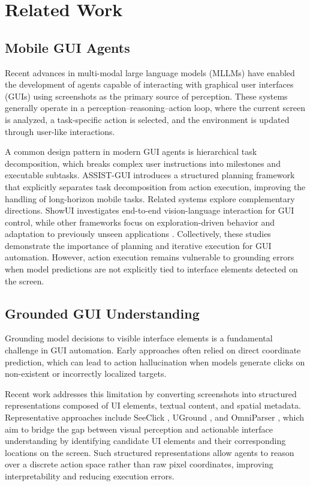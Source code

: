 \section{Related Work}
\label{related}

\subsection{Mobile GUI Agents}

Recent advances in multi-modal large language models (MLLMs) have enabled the development of agents capable of interacting with graphical user interfaces (GUIs) using screenshots as the primary source of perception. These systems generally operate in a perception--reasoning--action loop, where the current screen is analyzed, a task-specific action is selected, and the environment is updated through user-like interactions.

A common design pattern in modern GUI agents is hierarchical task decomposition, which breaks complex user instructions into milestones and executable subtasks. ASSIST-GUI \cite{gao2023assistgui} introduces a structured planning framework that explicitly separates task decomposition from action execution, improving the handling of long-horizon mobile tasks. Related systems explore complementary directions. ShowUI \cite{lin2025showui} investigates end-to-end vision-language interaction for GUI control, while other frameworks focus on exploration-driven behavior and adaptation to previously unseen applications \cite{sun2025gui,li2025uipro}. Collectively, these studies demonstrate the importance of planning and iterative execution for GUI automation. However, action execution remains vulnerable to grounding errors when model predictions are not explicitly tied to interface elements detected on the screen.

\subsection{Grounded GUI Understanding}

Grounding model decisions to visible interface elements is a fundamental challenge in GUI automation. Early approaches often relied on direct coordinate prediction, which can lead to action hallucination when models generate clicks on non-existent or incorrectly localized targets.

Recent work addresses this limitation by converting screenshots into structured representations composed of UI elements, textual content, and spatial metadata. Representative approaches include SeeClick \cite{cheng2024seeclick}, UGround \cite{qian2025uground}, and OmniParser \cite{lu2024omniparser}, which aim to bridge the gap between visual perception and actionable interface understanding by identifying candidate UI elements and their corresponding locations on the screen. Such structured representations allow agents to reason over a discrete action space rather than raw pixel coordinates, improving interpretability and reducing execution errors.

